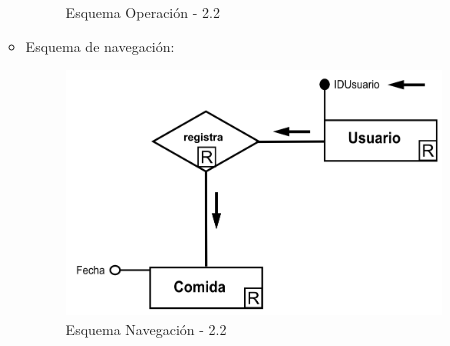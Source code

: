 \documentclass[a4paper,12pt]{report}
\begin{document}
\begin{enumerate}
\begin{itemize}
\begin{figure}[!htp]
\caption{Esquema Operación - 2.2}
\label{fig:ope22}
\medskip
\footnotesize
{}
\end{figure}
\item Esquema de navegación:
\begin{figure}[!htp]
\centering
\includegraphics[width=0.9\linewidth]{./operaciones/img/Estadisticas/22_nav.png}
\caption{Esquema Navegación - 2.2}
\label{fig:nave22}
\medskip
\footnotesize
{}
\end{figure}
\end{itemize}


\end{enumerate}
\end{document}
